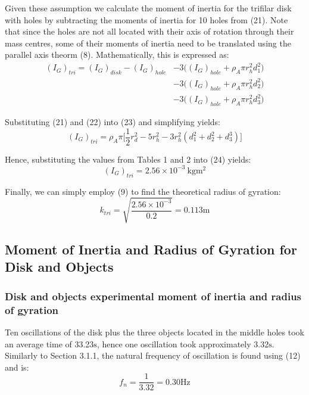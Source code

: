 \documentclass[a4paper]{article}
\begin{document}
Given these assumption we calculate the moment of inertia for the trifilar disk with holes by subtracting the moments of inertia for 10 holes from (21). Note that since the holes are not all located with their axis of rotation through their mass centres, some of their moments of inertia need to be translated using the parallel axis theorm (8). Mathematically, this is expressed as: 
\begin{align}
(I_G)_{tri} = (I_G)_{disk} - (I_G)_{hole} \nonumber &- 3\big((I_G)_{hole} + \rho_A \pi r_h^2 d_1^2\big) \nonumber \\
						   &- 3\big((I_G)_{hole} + \rho_A \pi r_h^2 d_2^2\big) \nonumber \\
						   &- 3\big((I_G)_{hole} + \rho_A \pi r_h^2 d_3^2\big)
\end{align}

Substituting (21) and (22) into (23) and simplifying yields:
\begin{equation}
(I_G)_{tri} = \rho_A \pi \bigg[ \frac{1}{2} r_d^2 - 5r_h^2 - 3r_h^2 (d_1^2 + d_2^2 + d_3^3) \bigg]
\end{equation}

Hence, substituting the values from Tables 1 and 2 into (24) yields:
\begin{equation}
	(I_G)_{tri} = 2.56 \times 10^{-3} \ \si{\kilogram\meter^2}
\end{equation}

Finally, we can simply employ (9) to find the theoretical radius of gyration:
\begin{equation}
	k_{tri} = \sqrt{\frac{2.56 \times 10^{-3}}{0.2}} = 0.113 \si{\meter}
\end{equation}

\subsection{Moment of Inertia and Radius of Gyration for Disk and Objects}
\subsubsection{Disk and objects experimental moment of inertia and radius of gyration}
Ten oscillations of the disk plus the three objects located in the middle holes took an average time of 33.23$\si{\second}$, hence one oscillation took approximately 3.32$\si{\second}$. Similarly to Section 3.1.1, the natural frequency of oscillation is found using (12) and is:
\begin{equation}
f_n = \frac{1}{3.32} = 0.30\si{\hertz}
\end{equation}
\end{document}
